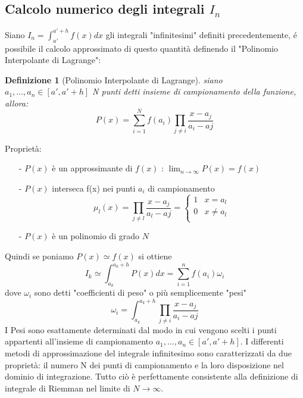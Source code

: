 \documentclass{article}
\newtheorem{legge}{Definizione}
\begin{document}
\subsection{Calcolo numerico degli integrali $I_{n}$}
Siano $I_{n}=\int_{a'}^{a'+h}f(x)dx$ gli integrali "infinitesimi" definiti precedentemente, é possibile il calcolo approssimato di questo quantità definendo il "Polinomio Interpolante di Lagrange":
	\begin{legge}[Polinomio Interpolante di Lagrange]
	siano $a_{1},\ldots,a_{n} \in [a',a'+ h]$ N punti detti insieme di campionamento della funzione, allora:
    	\begin{equation}
		P(x)=\sum_{i=1}^{N}f(a_{i})\prod_{j \neq i}\dfrac{x-a_{j}}{a_{i}-a{j}}
		\end{equation}
	\end{legge}

Proprietà:
\begin{itemize}
\item[-] $P(x)$ è un approssimante di $f(x)$ : $\lim_{n\rightarrow\infty}P(x)=f(x)$
\item[-] $P(x)$ interseca f(x) nei punti $a_{i}$ di campionamento
	\begin{displaymath}
		\mu_{l}(x)=\prod_{j \neq l}\dfrac{x-a_{j}}{a_{l}-a{j}} = \left\{
			\begin{array}{ll}
			1 & \textrm{$x=a_{l}$}\\
			0 & \textrm{$x\neq a_{l}$}\\
 			\end{array} 
		\right.
	\end{displaymath}
\item[-] $P(x)$ è un polinomio di grado $N$ 
\end{itemize}
Quindi se poniamo $P(x)\simeq f(x)$ si ottiene
	\begin{equation}
	I_{k}\simeq\int_{a_{k}}^{a_{k}+h}P(x)dx= \sum_{i=1}^{n}f(a_{i})\omega_{i}
	\end{equation}
dove $\omega_{i}$ sono detti "coefficienti di peso" o più semplicemente "pesi"
	\begin{equation}
	\omega_{i}=\int_{a_{k}}^{a_{k}+h}\prod_{j \neq i}\dfrac{x-a_{j}}{a_{i}-a{j}}
	\end{equation}
I Pesi sono esattamente determinati dal modo in cui vengono scelti i punti appartenti all'insieme di campionamento $a_{1},\ldots,a_{n} \in [a',a'+ h]$.
I differenti metodi di approssimazione del integrale infinitesimo sono caratterizzati da due proprietà: il numero N dei punti di campionamento e la loro disposizione nel dominio di integrazione.
Tutto ciò è perfettamente consistente alla definizione di integrale di Riemman nel limite di $N\longrightarrow\infty$.
\end{document}
